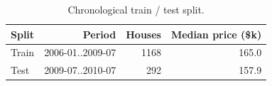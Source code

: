 \begin{table}[t]
\centering
\small
\begin{tabular}{lrrr}
\toprule
Split & Period & Houses & Median price (\$k) \\
\midrule
Train & 2006-01..2009-07 & 1168 & 165.0 \\
Test & 2009-07..2010-07 & 292 & 157.9 \\
\bottomrule
\end{tabular}
\caption{Chronological train / test split.}
\label{tab:split}
\end{table}
